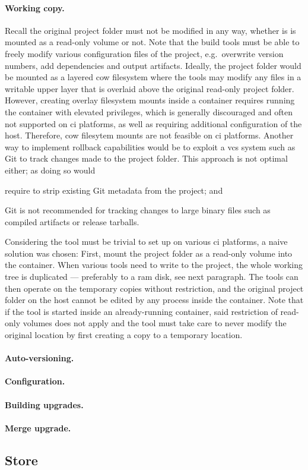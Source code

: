\paragraph{Working copy.} Recall the original project folder must not be modified in any way, whether is is mounted as a read-only volume or not. Note that the build tools must be able to freely modify various configuration files of the project, e.g.~overwrite version numbers, add dependencies and output artifacts.
Ideally, the project folder would be mounted as a layered \acrfull{cow} filesystem where the tools may modify any files in a writable upper layer that is overlaid above the original read-only project folder. However, creating overlay filesystem mounts inside a container requires running the container with elevated privileges, which is generally discouraged and often not supported on \acrshort{ci} platforms, as well as requiring additional configuration of the host. Therefore, \acrshort{cow} filesytem mounts are not feasible on \acrshort{ci} platforms. Another way to implement rollback capabilities would be to exploit a \acrfull{vcs} system such as Git to track changes made to the project folder. This approach is not optimal either; as doing so would \begin{enumerate*}[label=(\roman*)]
  \item require to strip existing Git metadata from the project; and
  \item Git is not recommended for tracking changes to large binary files such as compiled artifacts or release tarballs.
\end{enumerate*}

Considering the tool must be trivial to set up on various \acrshort{ci} platforms, a naive solution was chosen: First, mount the project folder as a read-only volume into the container. When various tools need to write to the project, the whole working tree is duplicated --- preferably to a \acrshort{ram} disk, see next paragraph. The tools can then operate on the temporary copies without restriction, and the original project folder on the host cannot be edited by any process inside the container. Note that if the tool is started inside an already-running container, said restriction of read-only volumes does not apply and the tool must take care to never modify the original location by first creating a copy to a temporary location.



\paragraph{Auto-versioning.}
\paragraph{Configuration.}
\paragraph{Building upgrades.}
\paragraph{Merge upgrade.}


\subsection{Store}
